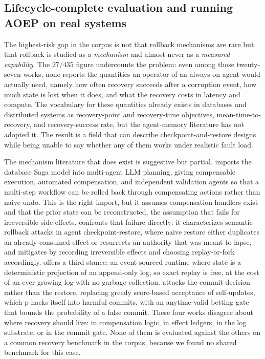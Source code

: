 \subsection{Lifecycle-complete evaluation and running AOEP on real systems}

The highest-risk gap in the corpus is not that rollback mechanisms are
rare but that rollback is studied as a \emph{mechanism} and almost never as a
\emph{measured capability}. The $27/435$ figure undercounts the problem: even among
those twenty-seven works, none reports the quantities an operator of an always-on
agent would actually need, namely how often recovery succeeds after a corruption
event, how much state is lost when it does, and what the recovery costs in latency
and compute. The vocabulary for these quantities already exists in databases and
distributed systems as recovery-point and recovery-time objectives, mean-time-to-recovery,
and recovery-success rate, but the agent-memory literature has not adopted it. The
result is a field that can describe checkpoint-and-restore designs while being unable
to say whether any of them works under realistic fault load.

The mechanism literature that does exist is suggestive but partial. \citet{chang2025sagallm}
imports the database Saga model into multi-agent LLM planning, giving compensable
execution, automated compensation, and independent validation agents so that a
multi-step workflow can be rolled back through compensating actions rather than naive
undo. This is the right import, but it assumes compensation handlers exist and that
the prior state can be reconstructed, the assumption that fails for irreversible
side effects. \citet{zheng2026acrfence} confronts that failure directly:
it characterizes semantic rollback attacks in agent checkpoint-restore, where naive
restore either duplicates an already-consumed effect or resurrects an authority that
was meant to lapse, and mitigates by recording irreversible effects and choosing
replay-or-fork accordingly. \citet{nakajima2026regimes} offers a third stance: an
event-sourced runtime where state is a deterministic projection of an append-only
log, so exact replay is free, at the cost of an ever-growing log with no garbage
collection. \citet{shawn2026pace} attacks the commit decision rather than the
restore, replacing greedy score-based acceptance of self-updates, which p-hacks
itself into harmful commits, with an anytime-valid betting gate that bounds the
probability of a false commit. These four works disagree about where recovery should
live: in compensation logic, in effect ledgers, in the log substrate, or in the
commit gate. None of them is evaluated against the others on a common recovery
benchmark in the corpus, because we found no shared benchmark for this case.

